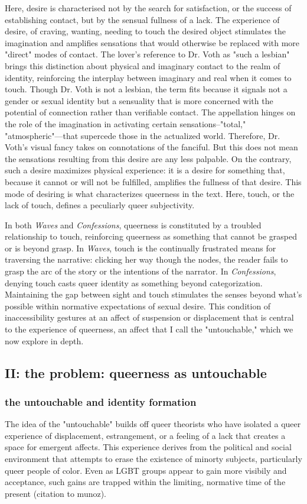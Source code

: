 \documentclass[11pt]{article}
\begin{document}
Here, desire is characterised not by the search for satisfaction, or
the success of establishing contact, but by the sensual fullness of a
lack. The experience of desire, of craving, wanting, needing to touch
the desired object stimulates the imagination and amplifies sensations
that would otherwise be replaced with more "direct" modes of
contact. The lover's reference to Dr. Voth as "such a lesbian" brings
this distinction about physical and imaginary contact to the realm of
identity, reinforcing the interplay between imaginary and real when it
comes to touch. Though Dr. Voth is not a lesbian, the term fits
because it signals not a gender or sexual identity but a sensuality
that is more concerned with the potential of connection rather than
verifiable contact. The appellation hinges on the role of the
imagination in activating certain sensations--"total,"
"atmospheric"---that supercede those in the actualized
world. Therefore, Dr. Voth's visual fancy takes on connotations of the
fanciful. But this does not mean the sensations resulting from this
desire are any less palpable. On the contrary, such a desire maximizes
physical experience: it is a desire for something that, because it
cannot or will not be fulfilled, amplifies the fullness of that
desire. This mode of desiring is what characterizes queerness in the
text. Here, touch, or the lack of touch, defines a peculiarly queer
subjectivity.

In both \emph{Waves} and \emph{Confessions}, queerness is constituted by a
troubled relationship to touch, reinforcing queerness as something
that cannot be grasped or is beyond grasp. In \emph{Waves}, touch is the
continually frustrated means for traversing the narrative: clicking
her way though the nodes, the reader fails to grasp the arc of the
story or the intentions of the narrator. In \emph{Confessions}, denying
touch casts queer identity as something beyond
categorization. Maintaining the gap between sight and touch stimulates
the senses beyond what's possible within normative expectations of
sexual desire. This condition of inaccessibility gestures at an affect
of suspension or displacement that is central to the experience of
queerness, an affect that I call the "untouchable," which we now
explore in depth.


\subsection{II: the problem: queerness as untouchable}
\label{sec:org69f283e}
\subsubsection{the untouchable and identity formation}
\label{sec:org05f9ed4}
The idea of the "untouchable" builds off queer theorists who have
isolated a queer experience of displacement, estrangement, or a
feeling of a lack that creates a space for emergent affects. This
experience derives from the political and social environment that
attempts to erase the existence of minorty subjects, particularly
queer people of color. Even as LGBT groups appear to gain more
visibily and acceptance, such gains are trapped within the limiting,
normative time of the present (citation to munoz). 
\end{document}
